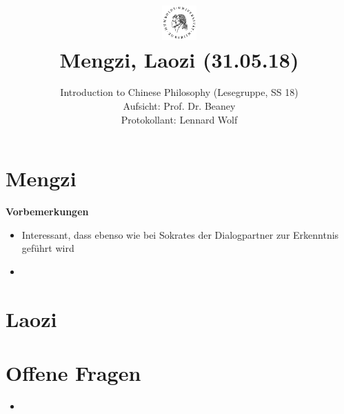 \documentclass[a4paper, emulatestandardclasses]{scrartcl}
\date{\vspace{-3ex}}
\begin{document}
\title{
    \vspace{-30pt}
	\includegraphics*[width=0.1\textwidth,right]{ErstesSem/images/hu_logo2.png}\\
	\vspace{-10pt}
	Mengzi, Laozi (31.05.18)}%
	\subtitle{Introduction to Chinese Philosophy (Lesegruppe, SS 18)\\
          Aufsicht: Prof. Dr. Beaney\\
          Protokollant: Lennard Wolf}
\maketitle
\vspace{-40pt}

\section*{Mengzi}
\textbf{Vorbemerkungen}

\begin{itemize}
  \item Interessant, dass ebenso wie bei Sokrates der Dialogpartner zur Erkenntnis geführt wird
  \item 
\end{itemize}


\section*{Laozi}


\section*{Offene Fragen}

\begin{itemize}
  \item 
\end{itemize}
\end{document}

